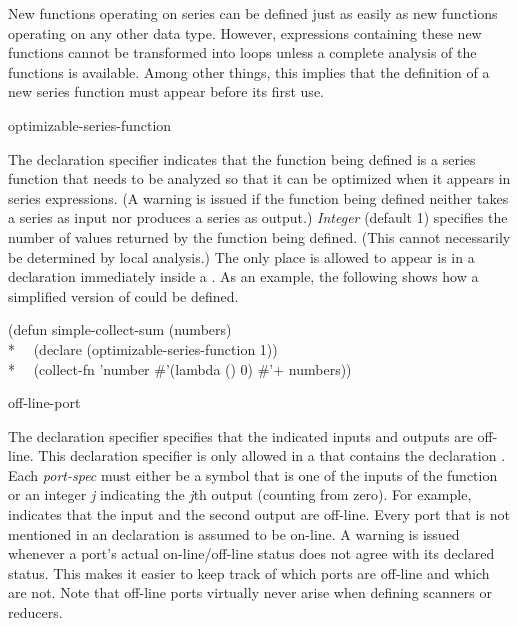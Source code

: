 New functions operating on series can be defined just as easily as new
functions operating on any other data type.  However, expressions
containing these new functions cannot be transformed into loops unless a
complete analysis of the functions is available.  Among other things,
this implies that the definition of a new series function must appear
before its first use.


\begin{defun}
optimizable-series-function

The declaration specifier  indicates
that the function being defined is a series function that needs to be
analyzed so that it can be optimized when it appears in series expressions.
(A warning is issued if the function being defined neither takes a series
as input nor produces a series as output.)  {\it Integer} (default 1)
specifies the number of values returned by the function being defined.
(This cannot necessarily be determined by local analysis.)  The only place
 is allowed to appear is in a declaration
immediately inside a .  As an example, the following shows how a
simplified version of  could be defined.
\begin{lisp}
(defun simple-collect-sum (numbers) \\*
~~(declare (optimizable-series-function 1)) \\*
~~(collect-fn 'number \#'(lambda () 0) \#'+ numbers))
\end{lisp}
\end{defun}

\begin{defun}
off-line-port

The declaration specifier
 specifies that the
indicated inputs and outputs are off-line.  This declaration
specifier is only allowed in a  that contains the declaration 
.  Each {\it port-spec} must either be a symbol
that is one of the inputs of the function or an integer {\it j} indicating the
{\it j\/}th output (counting from zero).  For example, 
indicates that the input  and the second output are off-line.
Every port that is not mentioned in an 
declaration is assumed to be on-line.  A warning is issued whenever a
port's actual on-line/off-line status does not agree with its declared
status.  This makes it easier to keep track of which ports are off-line and
which are not.  Note that off-line ports virtually never arise when
defining scanners or reducers.
\end{defun}

